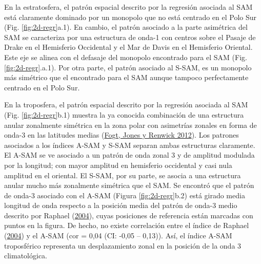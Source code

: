 \documentclass[12pt,oneside,a4paper]{reedthesis}
\begin{document}
En la estratosfera, el patrón espacial descrito por la regresión asociada al SAM está claramente dominado por un monopolo que no está centrado en el Polo Sur (Fig. \ref{fig:2d-regr}a.1).
En cambio, el patrón asociado a la parte asimétrica del SAM se caracteriza por una estructura de onda-1 con centros sobre el Pasaje de Drake en el Hemisferio Occidental y el Mar de Davis en el Hemisferio Oriental.
Este eje se alinea con el defasaje del monopolo encontrado para el SAM (Fig. \ref{fig:2d-regr}.a.1).
Por otra parte, el patrón asociado al S-SAM, es un monopolo más simétrico que el encontrado para el SAM aunque tampoco perfectamente centrado en el Polo Sur.

En la troposfera, el patrón espacial descrito por la regresión asociada al SAM (Fig. \ref{fig:2d-regr}b.1) muestra la ya conocida combinación de una estructura anular zonalmente simétrica en la zona polar con asimetrías zonales en forma de onda-3 en las latitudes medias (\protect\hyperlink{ref-fogt2012}{Fogt, Jones y Renwick 2012}).
Los patrones asociados a los índices A-SAM y S-SAM separan ambas estructuras claramente.
El A-SAM se ve asociado a un patrón de onda zonal 3 y de amplitud modulada por la longitud; con mayor amplitud en hemisferio occidental y casi nula amplitud en el oriental.
El S-SAM, por su parte, se asocia a una estructura anular mucho más zonalmente simétrica que el SAM.
Se encontró que el patrón de onda-3 asociado con el A-SAM (Figura \ref{fig:2d-regr}b.2) está girado media longitud de onda respecto a la posición media del patrón de onda-3 medio descrito por Raphael (\protect\hyperlink{ref-raphael2004}{2004}), cuyas posiciones de referencia están marcadas con puntos en la figura.
De hecho, no existe correlación entre el índice de Raphael (\protect\hyperlink{ref-raphael2004}{2004}) y el A-SAM (cor = 0,04 (CI: -0,05 -- 0,13)).
Así, el índice A-SAM troposférico representa un desplazamiento zonal en la posición de la onda 3 climatológica.
\end{document}
